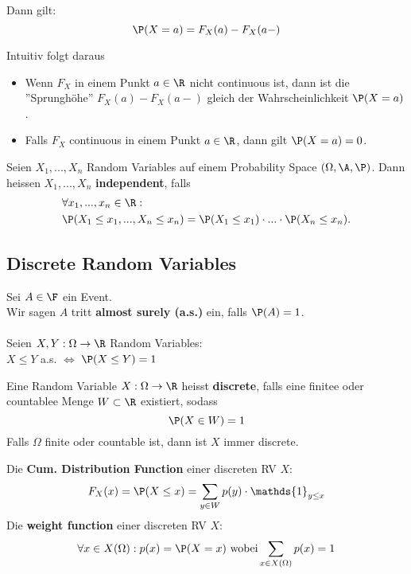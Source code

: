 Dann gilt:
$$\P(X = a) = F_X(a) - F_X(a-)$$

Intuitiv folgt daraus
\begin{itemize}
    \item Wenn $F_X$ in einem Punkt $a \in \R$ nicht continuous ist, dann ist die ''Sprunghöhe'' $F_X(a)-F_X(a-)$ gleich der Wahrscheinlichkeit $\P(X = a)$.
    \item Falls $F_X$ continuous in einem Punkt $a \in \R$, dann gilt $\P(X = a) = 0$. 
\end{itemize}

\begin{mainbox}{}
    Seien $X_1, ...,X_n$ Random Variables auf einem Probability Space $(\Omega, \A, \P)$. Dann heissen $X_1, ...,X_n$ \textbf{independent}, falls
    \begin{align*}
        &\forall x_1, ..., x_n \in \R:\\
        &\P(X_1 \leq x_1, ..., X_n \leq x_n) = \P(X_1 \leq x_1)\cdot ... \cdot \P(X_n \leq x_n).
    \end{align*} 
\end{mainbox}


\subsection{Discrete Random Variables}
Sei $A \in \F$ ein Event.\\
Wir sagen $A$ tritt \textbf{almost surely (a.s.)} ein, falls $\P(A)= 1$.
\\ \\
Seien $X, Y: \Omega \to \R$ Random Variables: \\$X \leq Y$ a.s. $\iff$ $\P(X \leq Y)=1$


\begin{mainbox}{}
    Eine Random Variable $X: \Omega \to \R$ heisst \textbf{discrete}, falls eine finitee oder countablee Menge $W \subset \R$ existiert, sodass
    $$\P(X \in W) = 1$$
    Falls $\Omega$ finite oder countable ist, dann ist $X$ immer discrete.
\end{mainbox}
Die \textbf{Cum. Distribution Function} einer discreten RV $X$: $$F_X(x)= \P(X \leq x)= \sum_{y\in W}p(y)\cdot \mathds{1}_{y\leq x}$$
Die \textbf{weight function} einer discreten RV $X$: $$\forall x \in X(\Omega): p(x)= \P(X=x) \text{ wobei} \sum_{x \in X(\Omega)}p(x)= 1$$

